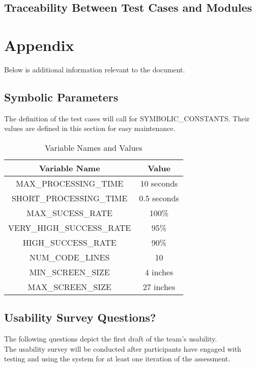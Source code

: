 \documentclass[12pt, titlepage]{article}
\begin{document}
\subsection{Traceability Between Test Cases and Modules}

				




\newpage

\section{Appendix}

Below is additional information relevant to the document.

\subsection{Symbolic Parameters}

The definition of the test cases will call for SYMBOLIC\_CONSTANTS.
Their values are defined in this section for easy maintenance.

\begin{table}[h!]
  \centering
  \begin{tabular}{|c|c|}
      \hline
      \textbf{Variable Name} & \textbf{Value} \\
      \hline
      MAX\_PROCESSING\_TIME & 10 seconds \\
      \hline
      SHORT\_PROCESSING\_TIME & 0.5 seconds \\
      \hline
      MAX\_SUCESS\_RATE & 100\% \\
      \hline
      VERY\_HIGH\_SUCCESS\_RATE & 95\% \\
      \hline
      HIGH\_SUCCESS\_RATE & 90\% \\
      \hline
      NUM\_CODE\_LINES & 10 \\
      \hline
      MIN\_SCREEN\_SIZE & 4 inches \\
      \hline
      MAX\_SCREEN\_SIZE & 27 inches \\
      \hline
  \end{tabular}
  \caption{Variable Names and Values}
  \label{tab:variables}
\end{table}

\subsection{Usability Survey Questions?}
The following questions depict the first draft of the team's usability.\\
The usability survey will be conducted after participants have engaged with testing and using the system for at least one iteration of the assessment.\\
\end{document}
